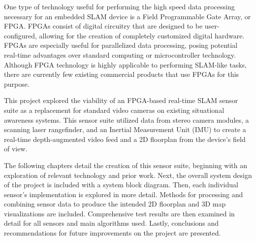 \par
One type of technology useful for performing the high speed data processing necessary for an embedded SLAM device is a Field Programmable Gate Array, or FPGA. FPGAs consist of digital circuitry that are designed to be user-configured, allowing for the creation of completely customized digital hardware. FPGAs are especially useful for parallelized data processing, posing potential real-time advantages over standard computing or microcontroller technology. Although FPGA technology is highly applicable to performing SLAM-like tasks, there are currently few existing commercial products that use FPGAs for this purpose. 
\par
This project explored the viability of an FPGA-based real-time SLAM sensor suite as a replacement for standard video cameras on existing situational awareness systems. This sensor suite utilized data from stereo camera modules, a scanning laser rangefinder, and an Inertial Measurement Unit (IMU) to create a real-time depth-augmented video feed and a 2D floorplan from the device's field of view.
\par
The following chapters detail the creation of this sensor suite, beginning with an exploration of relevant technology and prior work. Next, the overall system design of the project is included with a system block diagram. Then, each individual sensor’s implementation is explored in more detail. Methods for processing and combining sensor data to produce the intended 2D floorplan and 3D map visualizations are included. Comprehensive test results are then examined in detail for all sensors and main algorithms used. Lastly, conclusions and recommendations for future improvements on the project are presented. 
